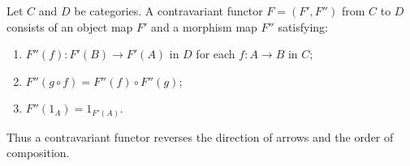 Let $C$ and $D$ be categories. A contravariant functor $F = (F', F'')$ from $C$ to $D$ consists of an object map $F'$ and a morphism map $F''$ satisfying:
\begin{enumerate}
\item[(F.1)*] $F''(f): F'(B) \to F'(A)$ in $D$ for each $f: A \to B$ in $C$;
\item[(F.2)*] $F''(g \circ f) = F''(f) \circ F''(g)$;
\item[(F.3)] $F''(1_A) = 1_{F'(A)}$.
\end{enumerate}
Thus a contravariant functor reverses the direction of arrows and the order of composition.
